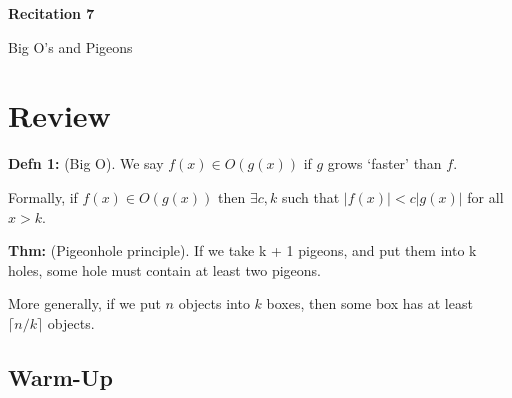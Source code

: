 \documentclass[12pt,letterpaper]{article}
\begin{document}
  \thispagestyle{firstpagestyle}
  \begin{center}
    {\large \textbf{Recitation 7}}
    
    {\large Big O's and Pigeons}

  \end{center}

	\section*{Review}



	\textbf{Defn 1:} (Big O). We say $f(x) \in O(g(x))$ if $g$ grows `faster' than $f$.

		Formally, if $f(x) \in O(g(x))$ then $\exists c,k$ such that $|f(x)| < c|g(x)|$ for all $x > k$. 

	\textbf{Thm:} (Pigeonhole principle). If we take k + 1 pigeons, and put them into k holes, some hole must contain at least two pigeons.

	More generally, if we put $n$ objects into $k$ boxes, then some box has at least $\lceil n/k \rceil$ objects.


	\subsection*{Warm-Up}
\end{document}
